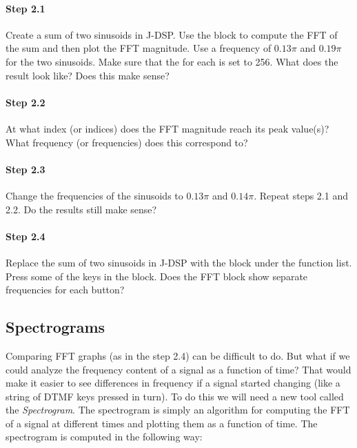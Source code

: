 \paragraph{Step 2.1} 
Create a sum of two sinusoids in J-DSP. Use the  block to
compute the FFT of the sum and then plot the FFT magnitude. Use a
frequency of $0.13\pi$ and $0.19\pi$ for the two sinusoids. Make sure
that the  for each is set to 256. What does the
result look like? Does this make sense?


\paragraph{Step 2.2} At what index (or indices) does the FFT magnitude
reach its peak value(s)? What frequency (or frequencies) does this
correspond to?


\paragraph{Step 2.3} Change the frequencies of the sinusoids to
$0.13\pi$ and $0.14\pi$. Repeat steps 2.1 and 2.2. Do the results
still make sense?


\paragraph{Step 2.4} Replace the sum of two sinusoids in J-DSP with
the  block under the  function
list. Press some of the keys in the  block. Does the FFT
block show separate frequencies for each button?



\subsection{Spectrograms}
Comparing FFT graphs (as in the step 2.4) can be difficult to do. But
what if we could analyze the frequency content of a signal as a
function of time? That would make it easier to see differences in
frequency if a signal started changing (like a string of DTMF keys
pressed in turn). To do this we will need a new tool called the
\emph{Spectrogram}. The spectrogram is simply an algorithm for
computing the FFT of a signal at different times and plotting them as
a function of time. The spectrogram is computed in the following way:

